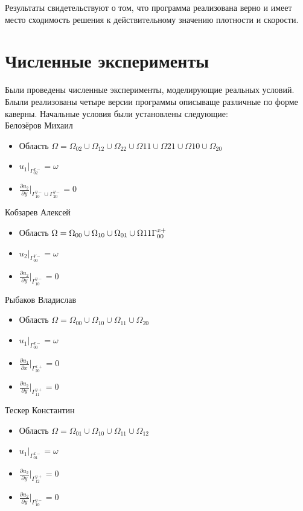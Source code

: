 \documentclass[a4paper, 25pt]{article}
\begin{document}
Результаты свидетельствуют о том, что программа реализована верно и имеет место сходимость решения к действительному значению плотности и скорости.
\newpage

\section {Численные эксперименты}

Были проведены численные эксперименты, моделирующие реальных условий.
Блыли реализованы четыре версии программы описываще различные по форме каверны.
Начальные условия были установлены следующие:\\
Белозёров Михаил
\begin {itemize}
\item Область $\Omega = \Omega_{02} \cup \Omega_{12} \cup \Omega_{22} \cup \Omega{11} \cup \Omega{21} \cup \Omega{10} \cup \Omega_{20}$
  \item $u_1|_{\Gamma_{02}^{x-}} = \omega$
  \item $\frac{{\partial}u_2}{{\partial}y}|_{\Gamma_{10}^{y-}\cup\Gamma_{20}^{y-}} = 0$
\end   {itemize}
Кобзарев Алексей
\begin {itemize}
\item Область $\Omega = \Omega_{00} \cup \Omega_{10} \cup \Omega_{01} \cup \Omega{11} \\ \Gamma^{x+}_{00}$
  \item $u_2|_{\Gamma_{00}^{Y-}} = \omega$
  \item $\frac{{\partial}u_2}{{\partial}y}|_{\Gamma_{10}^{y-}} = 0$
\end   {itemize}
Рыбаков Владислав
\begin {itemize}
  \item Область $\Omega = \Omega_{00}\cup\Omega_{10}\cup\Omega_{11}\cup\Omega_{20}$
  \item $u_1|_{\Gamma_{00}^{x-}} = \omega$
  \item $\frac{{\partial}u_1}{{\partial}x}|_{\Gamma_{20}^{x+}} = 0$
  \item $\frac{{\partial}u_2}{{\partial}y}|_{\Gamma_{11}^{y+}} = 0$
\end   {itemize}
Тескер Константин
\begin {itemize}
  \item Область $\Omega = \Omega_{01}\cup\Omega_{10}\cup\Omega_{11}\cup\Omega_{12}$
  \item $u_1|_{\Gamma_{01}^{x-}} = \omega$
  \item $\frac{{\partial}u_2}{{\partial}y}|_{\Gamma_{12}^{y+}} = 0$
  \item $\frac{{\partial}u_2}{{\partial}y}|_{\Gamma_{10}^{y-}} = 0$
\end   {itemize}
\end{document}
